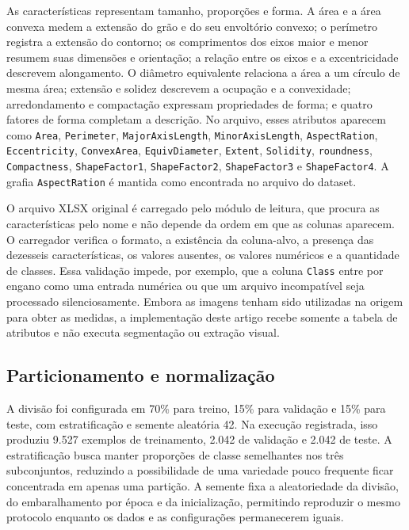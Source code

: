 \documentclass[12pt]{article}
\begin{document}
As características representam tamanho, proporções e forma. A área e a área convexa medem a extensão do grão e do seu envoltório convexo; o perímetro registra a extensão do contorno; os comprimentos dos eixos maior e menor resumem suas dimensões e orientação; a relação entre os eixos e a excentricidade descrevem alongamento. O diâmetro equivalente relaciona a área a um círculo de mesma área; extensão e solidez descrevem a ocupação e a convexidade; arredondamento e compactação expressam propriedades de forma; e quatro fatores de forma completam a descrição. No arquivo, esses atributos aparecem como \texttt{Area}, \texttt{Perimeter}, \texttt{MajorAxisLength}, \texttt{MinorAxisLength}, \texttt{AspectRation}, \texttt{Eccentricity}, \texttt{ConvexArea}, \texttt{EquivDiameter}, \texttt{Extent}, \texttt{Solidity}, \texttt{roundness}, \texttt{Compactness}, \texttt{ShapeFactor1}, \texttt{ShapeFactor2}, \texttt{ShapeFactor3} e \texttt{ShapeFactor4}. A grafia \texttt{AspectRation} é mantida como encontrada no arquivo do dataset.

O arquivo XLSX original é carregado pelo módulo de leitura, que procura as características pelo nome e não depende da ordem em que as colunas aparecem. O carregador verifica o formato, a existência da coluna-alvo, a presença das dezesseis características, os valores ausentes, os valores numéricos e a quantidade de classes. Essa validação impede, por exemplo, que a coluna \texttt{Class} entre por engano como uma entrada numérica ou que um arquivo incompatível seja processado silenciosamente. Embora as imagens tenham sido utilizadas na origem para obter as medidas, a implementação deste artigo recebe somente a tabela de atributos e não executa segmentação ou extração visual.

\subsection{Particionamento e normalização}

A divisão foi configurada em 70\% para treino, 15\% para validação e 15\% para teste, com estratificação e semente aleatória 42. Na execução registrada, isso produziu 9.527 exemplos de treinamento, 2.042 de validação e 2.042 de teste. A estratificação busca manter proporções de classe semelhantes nos três subconjuntos, reduzindo a possibilidade de uma variedade pouco frequente ficar concentrada em apenas uma partição. A semente fixa a aleatoriedade da divisão, do embaralhamento por época e da inicialização, permitindo reproduzir o mesmo protocolo enquanto os dados e as configurações permanecerem iguais.
\end{document}
